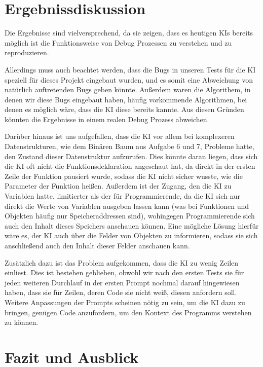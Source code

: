 \documentclass[a4paper,12pt,ngerman]{scrartcl}
\begin{document}
\section{Ergebnissdiskussion}

Die Ergebnisse sind vielversprechend, da sie zeigen, dass es heutigen KIs bereits möglich ist die Funktionsweise von Debug Prozessen zu verstehen und zu reproduzieren.

Allerdings muss auch beachtet werden, dass die Bugs in unseren Tests für die KI speziell für dieses Projekt eingebaut wurden, und es somit eine Abweichung von natürlich auftretenden Bugs geben könnte. Außerdem waren die Algorithem, in denen wir diese Bugs eingebaut haben, häufig vorkommende Algorithmen, bei denen es möglich wäre, dass die KI diese bereits kannte. Aus diesen Gründen könnten die Ergebnisse in einem realen Debug Prozess abweichen.

Darüber hinaus ist uns aufgefallen, dass die KI vor allem bei komplexeren Datenstrukturen, wie dem Binären Baum aus Aufgabe 6 und 7, Probleme hatte, den Zustand dieser Datenstruktur aufzurufen. Dies könnte daran liegen, dass sich die KI oft nicht die Funktionsdeklaration angeschaut hat, da direkt in der ersten Zeile der Funktion pausiert wurde, sodass die KI nicht sicher wusste, wie die Parameter der Funktion heißen. Außerdem ist der Zugang, den die KI zu Variablen hatte, limitierter als der für Programmierende, da die KI sich nur direkt die Werte von Variablen ausgeben lassen kann (was bei Funktionen und Objekten häufig nur Speicheraddressen sind), wohingegen Programmierende sich auch den Inhalt dieses Speichers anschauen können. Eine mögliche Lösung hierfür wäre es, der KI auch über die Felder von Objekten zu informieren, sodass sie sich anschließend auch den Inhalt dieser Felder anschauen kann.

Zusätzlich dazu ist das Problem aufgekommen, dass die KI zu wenig Zeilen einliest. Dies ist bestehen geblieben, obwohl wir nach den ersten Tests sie für jeden weiteren Durchlauf in der ersten Prompt nochmal darauf hingewiesen haben, dass sie für Zeilen, deren Code sie nicht weiß, diesen anfordern soll. Weitere Anpassungen der Prompts scheinen nötig zu sein, um die KI dazu zu bringen, genügen Code anzufordern, um den Kontext des Programms verstehen zu können.

\section{Fazit und Ausblick}
\end{document}
